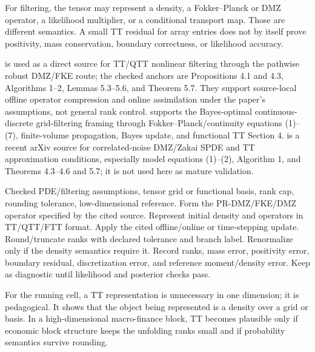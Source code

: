 For filtering, the tensor may represent a density, a Fokker--Planck or DMZ
operator, a likelihood multiplier, or a conditional transport map.  Those are
different semantics.  A small TT residual for array entries does not by itself
prove positivity, mass conservation, boundary correctness, or likelihood
accuracy.

\citet{li2019ttfiltering} is used as a direct source for TT/QTT nonlinear
filtering through the pathwise robust DMZ/FKE route; the checked anchors are
Propositions 4.1 and 4.3, Algorithms 1--2, Lemmas 5.3--5.6, and Theorem 5.7.
They support source-local offline operator compression and online assimilation
under the paper's assumptions, not general rank control.  \citet{fox2021grid}
supports the Bayes-optimal continuous-discrete grid-filtering framing through
Fokker--Planck/continuity equations (1)--(7), finite-volume propagation, Bayes
update, and functional TT Section 4.  \citet{meng2026correlated} is a recent
arXiv source for correlated-noise DMZ/Zakai SPDE and TT approximation
conditions, especially model equations (1)--(2), Algorithm 1, and Theorems
4.3--4.6 and 5.7; it is not used here as mature validation.

\begin{algorithm}
\caption{TT/PR-DMZ filtering pilot}
\label{alg:bf-hd-tt-pde}
\begin{algorithmic}[1]
\Require Checked PDE/filtering assumptions, tensor grid or functional basis,
  rank cap, rounding tolerance, low-dimensional reference.
\State Form the PR-DMZ/FKE/DMZ operator specified by the cited source.
\State Represent initial density and operators in TT/QTT/FTT format.
  \State Apply the cited offline/online or time-stepping update.
  \State Round/truncate ranks with declared tolerance and branch label.
  \State Renormalize only if the density semantics require it.
  \State Record ranks, mass error, positivity error, boundary residual,
    discretization error, and reference moment/density error.
\EndFor
\State Keep as diagnostic until likelihood and posterior checks pass.
\end{algorithmic}
\end{algorithm}

For the running cell, a TT representation is unnecessary in one dimension; it
is pedagogical.  It shows that the object being represented is a density over a
grid or basis.  In a high-dimensional macro-finance block, TT becomes plausible
only if economic block structure keeps the unfolding ranks small and if
probability semantics survive rounding.

